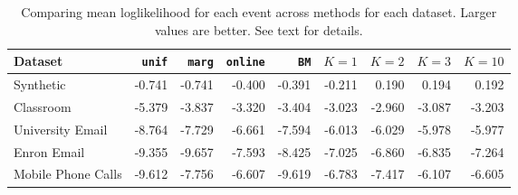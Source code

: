 \begin{table}[t]
\begin{center}
{\footnotesize
\begin{tabular}{lrrrrrrrr}
  \hline
Dataset & \texttt{unif} & \texttt{marg} & \texttt{online} & \texttt{BM} & $K=1$ & $K=2$ & $K=3$ & $K=10$ \\ 
  \hline
Synthetic & -0.741 & -0.741 & -0.400 & -0.391 & -0.211 & 0.190 & 0.194 & 0.192 \\ 
  Classroom & -5.379 & -3.837 & -3.320 & -3.404 & -3.023 & -2.960 & -3.087 & -3.203 \\ 
  University Email & -8.764 & -7.729 & -6.661 & -7.594 & -6.013 & -6.029 & -5.978 & -5.977 \\ 
  Enron Email & -9.355 & -9.657 & -7.593 & -8.425 & -7.025 & -6.860 & -6.835 & -7.264 \\ 
  Mobile Phone Calls & -9.612 & -7.756 & -6.607 & -9.619 & -6.783 & -7.417 & -6.107 & -6.605 \\ 
   \hline
\end{tabular}
}
\caption{Comparing mean loglikelihood for each event across methods for each dataset.  Larger values are better.  See text for details.}
\label{tab:results}
\end{center}
\end{table}
